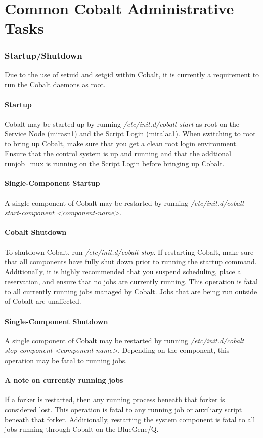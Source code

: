 \documentclass[10pt,letterpaper]{article}
\begin{document}
\part*{Common Cobalt Administrative Tasks}
\section*{Startup/Shutdown}
Due to the use of setuid and setgid within Cobalt, it is currently a requirement to run the Cobalt daemons as root.
\subsection*{Startup}
Cobalt may be started up by running \textit{/etc/init.d/cobalt start} as root on the Service Node (mirasn1) and the Script Login (miralac1).  When switching to root to bring up Cobalt, make sure that you get a clean root login environment.  Ensure that the control system is up and running and that the addtional runjob\_mux is running on the Script Login before bringing up Cobalt.  
\subsection*{Single-Component Startup}
A single component of Cobalt may be restarted by running \textit{/etc/init.d/cobalt start-component \textless component-name\textgreater}.
\subsection*{Cobalt Shutdown}
To shutdown Cobalt, run \textit{/etc/init.d/cobalt stop}.  If restarting Cobalt, make sure that all components have fully shut down prior to running the startup command.  Additionally, it is highly recommended that you suspend scheduling, place a reservation, and ensure that no jobs are currently running.  This operation is fatal to all currently running jobs managed by Cobalt.   Jobs that are being run outside of Cobalt are unaffected.
\subsection*{Single-Component Shutdown}
A single component of Cobalt may be restarted by running \textit{/etc/init.d/cobalt stop-component \textless component-name\textgreater}.  Depending on the component, this operation may be fatal to running jobs.
\subsection*{A note on currently running jobs}
If a forker is restarted, then any running process beneath that forker is considered lost.  This operation is fatal to any running job or auxiliary script beneath that forker.  Additionally, restarting the system component is fatal to all jobs running through Cobalt on the BlueGene/Q.
\end{document}
